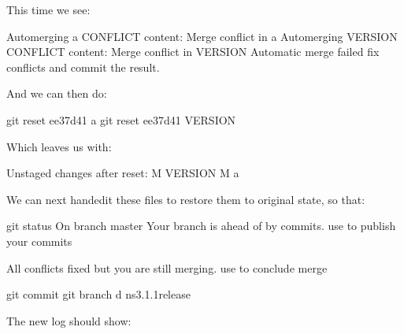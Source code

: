\documentclass[letterpaper,10pt,english]{sphinxmanual}
\begin{document}
This time we see:

\begin{sphinxVerbatim}[commandchars=\\\{\}]
Auto\PYGZhy{}merging a
CONFLICT content: Merge conflict in a
Auto\PYGZhy{}merging VERSION
CONFLICT content: Merge conflict in VERSION
Automatic merge failed fix conflicts and  commit the result.
\end{sphinxVerbatim}

And we can then do:

\begin{sphinxVerbatim}[commandchars=\\\{\}]
\PYGZdl{} git reset ee37d41 a
\PYGZdl{} git reset ee37d41 VERSION
\end{sphinxVerbatim}

Which leaves us with:

\begin{sphinxVerbatim}[commandchars=\\\{\}]
Unstaged changes after reset:
M     VERSION
M     a
\end{sphinxVerbatim}

We can next hand\sphinxhyphen{}edit these files to restore them to original state, so that:

\begin{sphinxVerbatim}[commandchars=\\\{\}]
\PYGZdl{} git status
On branch master
Your branch is ahead of  by  commits.
  use  to publish your  commits

All conflicts fixed but you are still merging.
  use  to conclude merge

\PYGZdl{} git commit
\PYGZdl{} git branch \PYGZhy{}d ns\PYGZhy{}3.1.1\PYGZhy{}release
\end{sphinxVerbatim}

The new log should show:
\end{document}
